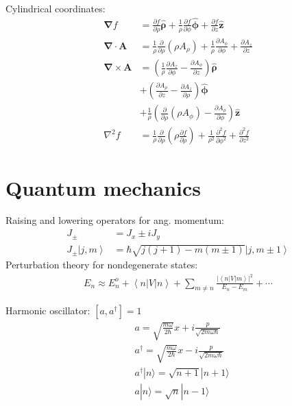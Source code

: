 \documentclass[10pt,twocolumn]{article}
\newcommand{\D}{\mathbf{\nabla}}
\newcommand{\A}{\mathbf{A}}
\newcommand{\laplacian}{\nabla^2}
\newcommand{\zhat}{\mathbf{\hat{z}}}
\newcommand{\rhohat}{\mathbf{\hat{\rho}}}
\newcommand{\phihat}{\mathbf{\hat{\phi}}}
\begin{document}
  Cylindrical coordinates:
  \begin{align*}
    \D f &= \frac{\partial f}{\partial\rho}\rhohat
    + \frac1\rho \frac{\partial f}{\partial\phi} \phihat
    + \frac{\partial f}{\partial z}\zhat\\
    \D\cdot\A &=
    \frac1\rho \frac{\partial}{\partial\rho}\left(\rho A_\rho\right)
    + \frac1\rho \frac{\partial A_\phi}{\partial\phi}
    + \frac{\partial A_z}{\partial z} \\
    \D\times\A &= \left(\frac1\rho\frac{\partial A_z}{\partial\phi}
                  - \frac{\partial A_\phi}{\partial z}\right)\rhohat \\
    &+ \left(\frac{\partial A_\rho}{\partial z} -
             \frac{\partial A_z}{\partial\rho}\right)\phihat \\
    &+ \frac1\rho\left(\frac{\partial}{\partial\rho}(\rho A_\phi) -
                \frac{\partial A_\rho}{\partial\phi} \right)\zhat \\
    \laplacian f &=
    \frac1\rho\frac{\partial}{\partial\rho}
    \left(\rho\frac{\partial f}{\partial\rho}\right)
    + \frac1{\rho^2}\frac{\partial^2f}{\partial\phi^2}
    + \frac{\partial^2f}{\partial z^2}
  \end{align*}

  \section{Quantum mechanics}
  Raising and lowering operators for ang. momentum:
  \begin{align*}
    J_\pm &= J_x \pm i J_y \\
    J_\pm \left|j,m\right> &= \hbar\sqrt{j(j+1)-m(m\pm1)}
      \left|j,m\pm1\right>
  \end{align*}
  Perturbation theory for
  nondegenerate states:
  \begin{align*}
    E_n \approx E_n^o + \left<n\right|V\left|n\right>
      + \sum_{m\ne n}
      \frac{\left|\left<n\right|V\left|m\right>\right|^2}{E_n-E_m}
      + \cdots
  \end{align*}

  Harmonic oscillator: $[a,a^{\dagger}]=1$
  \begin{align*}
    &a = \sqrt{\frac{m\omega}{2\hbar}}x+i\frac{p}{\sqrt{2m\omega\hbar}} \\
    &a^{\dagger} =
    \sqrt{\frac{m\omega}{2\hbar}}x-i\frac{p}{\sqrt{2m\omega\hbar}}\\
    &a^{\dagger}|n\rangle=\sqrt{n+1}|n+1\rangle \\
    &a|n\rangle=\sqrt{n}|n-1\rangle \\
  \end{align*}
\end{document}
